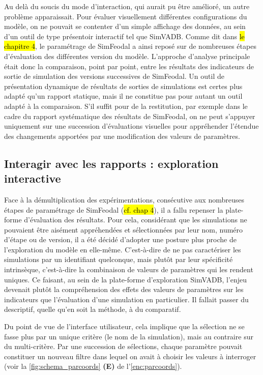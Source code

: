 	
	Au delà du soucis du mode d'interaction, qui aurait pu être amélioré, un autre problème apparaissait.
	Pour évaluer visuellement différentes configurations du modèle, on ne pouvait se contenter d'un simple affichage des données, au sein d'un outil de type présentoir interactif tel que SimVADB.
	Comme dit dans \hl{le chapitre 4}, le paramétrage de SimFeodal a ainsi reposé sur de nombreuses étapes d'évaluation des différentes version du modèle.
	L'approche d'analyse principale était donc la comparaison, point par point, entre les résultats des indicateurs de sortie de simulation des versions successives de SimFeodal.
	Un outil de présentation dynamique de résultats de sorties de simulations est certes plus adapté qu'un rapport statique, mais il ne constitue pas pour autant un outil adapté à la comparaison.
	S'il suffit pour de la restitution, par exemple dans le cadre du rapport systématique des résultats de SimFeodal, on ne peut s'appuyer uniquement sur une succession d'évaluations visuelles pour appréhender l'étendue des changements apportées par une modification des valeurs de paramètres.

	\subsection{Interagir avec les rapports : exploration interactive}\label{subsec:explo-interactive}

	Face à la démultiplication des expérimentations, consécutive aux nombreuses étapes de paramétrage de SimFeodal (\hl{cf. chap 4}), il a fallu repenser la plate-forme d'évaluation des résultats.
	Pour cela, considérant que les simulations ne pouvaient être aisément appréhendées et sélectionnées par leur nom, numéro d'étape ou de version, il a été décidé d'adopter une posture plus proche de l'exploration du modèle en elle-même.
	C'est-à-dire de ne pas caractériser les simulations par un identifiant quelconque, mais plutôt par leur spécificité intrinsèque, c'est-à-dire la combinaison de valeurs de paramètres qui les rendent uniques.
	Ce faisant, au sein de la plate-forme d'exploration SimVADB, l'enjeu devenait plutôt la compréhension des effets des valeurs de paramètres sur les indicateurs que l'évaluation d'une simulation en particulier.
	Il fallait passer du descriptif, quelle qu'en soit la méthode, à du comparatif.
	
	Du point de vue de l'interface utilisateur, cela implique que la sélection ne se fasse plus par un unique critère (le nom de la simulation), mais au contraire sur du multi-critère.
	Par une succession de sélections, chaque paramètre pouvait constituer un nouveau filtre dans lequel on avait à choisir les valeurs à interroger (voir la \cref{fig:schema_parcoords} \textbf{(E)} de l'\cref{enc:parcoords}).

